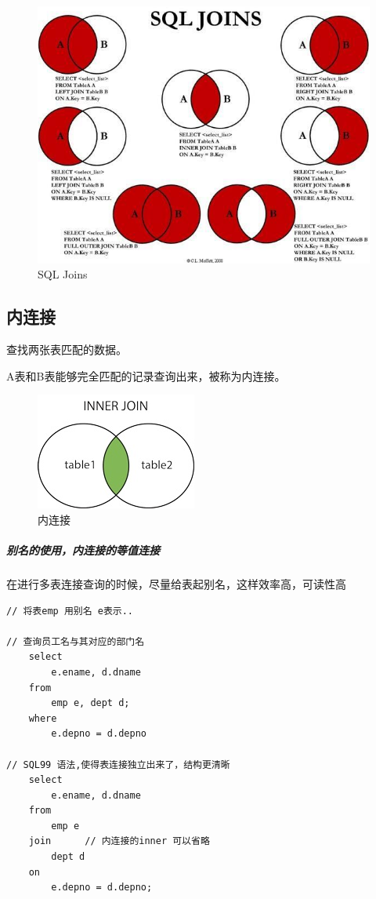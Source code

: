 \documentclass[UTF8,a4paper,12pt]{ctexbook}
\begin{document}
		\begin{figure}[H]
			\centering
			\includegraphics[scale=.76]{joins}
			\caption{SQL Joins}
		\end{figure}
		
	\subsection{内连接}		
			查找两张表匹配的数据。
			
			A表和B表能够完全匹配的记录查询出来，被称为内连接。
			\begin{figure}[H]
				\centering
				\includegraphics[scale=1]{innoJoin}
				\caption{内连接}
			\end{figure}
			
			\subparagraph{别名的使用，内连接的等值连接} 在进行多表连接查询的时候，尽量给表起别名，这样效率高，可读性高
				\begin{lstlisting}
// 将表emp 用别名 e表示..	

// 查询员工名与其对应的部门名
	select	
		e.ename, d.dname
	from 
		emp e, dept d;
	where 
		e.depno = d.depno
		
// SQL99 语法,使得表连接独立出来了，结构更清晰
	select 
		e.ename, d.dname
	from 
		emp e
	join	  // 内连接的inner 可以省略 
	    dept d
	on 
		e.depno = d.depno;
					\end{lstlisting}
					
\end{document}

